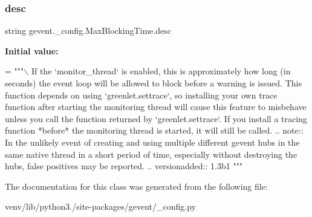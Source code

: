 \subsubsection{\texorpdfstring{desc}{desc}}
{\footnotesize\ttfamily string gevent.\+\_\+config.\+Max\+Blocking\+Time.\+desc\hspace{0.3cm}{\ttfamily [static]}}

{\bfseries Initial value\+:}
\begin{DoxyCode}
=  \textcolor{stringliteral}{"""\(\backslash\)}
\textcolor{stringliteral}{If the `monitor\_thread` is enabled, this is}
\textcolor{stringliteral}{approximately how long (in seconds)}
\textcolor{stringliteral}{the event loop will be allowed to block before a warning is issued.}
\textcolor{stringliteral}{}
\textcolor{stringliteral}{This function depends on using `greenlet.settrace`, so installing}
\textcolor{stringliteral}{your own trace function after starting the monitoring thread will}
\textcolor{stringliteral}{cause this feature to misbehave unless you call the function}
\textcolor{stringliteral}{returned by `greenlet.settrace`. If you install a tracing function *before*}
\textcolor{stringliteral}{the monitoring thread is started, it will still be called.}
\textcolor{stringliteral}{}
\textcolor{stringliteral}{.. note:: In the unlikely event of creating and using multiple different}
\textcolor{stringliteral}{    gevent hubs in the same native thread in a short period of time,}
\textcolor{stringliteral}{    especially without destroying the hubs, false positives may be reported.}
\textcolor{stringliteral}{}
\textcolor{stringliteral}{.. versionadded:: 1.3b1}
\textcolor{stringliteral}{"""}
\end{DoxyCode}


The documentation for this class was generated from the following file\+:\begin{DoxyCompactItemize}
\item 
venv/lib/python3./site-\/packages/gevent/\+\_\+config.\+py\end{DoxyCompactItemize}
